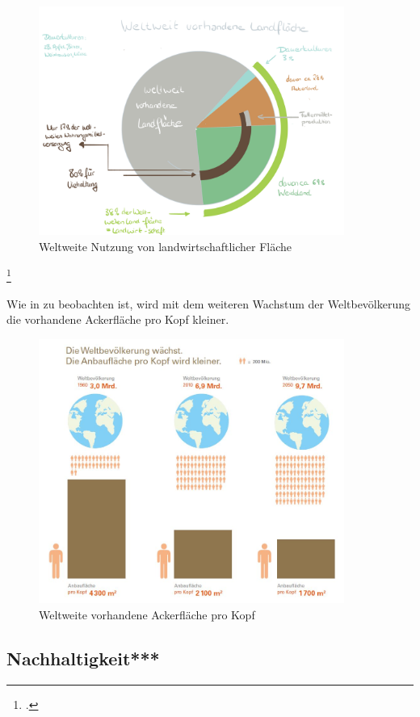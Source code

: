 \documentclass{scrartcl}
\begin{document}
\begin{figure}[htbp]
\centering
\includegraphics[width=10cm]{image_folder/LFlaeche.png}
\caption{Weltweite Nutzung von landwirtschaftlicher Fläche}
\label{fig:lFlaeche}
\end{figure}\footcite[Eigene Darstellung in Anlehnung an]{2008FAOSTAT}

Wie in \label{fig:AckerproKopf} zu beobachten ist, wird mit dem weiteren Wachstum der Weltbevölkerung die vorhandene Ackerfläche pro Kopf kleiner. 

\begin{figure}[htbp]
\centering
\includegraphics[width=10cm]{image_folder/weltbevoelkerung_anbauflaeche_pro_kopf.jpg}
\caption{Weltweite vorhandene Ackerfläche pro Kopf}
\label{fig:AckerproKopf}
\end{figure}

\subsection{Nachhaltigkeit***}
\end{document}
